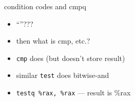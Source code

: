 \begin{frame}{condition codes and cmpq}
\begin{itemize}
\item ``''???
\item then what is cmp, etc.?
\item \texttt{cmp} does  (but doesn't store result)
\vspace{.5cm}
\item similar \texttt{test} does bitwise-and
\item {\tt {\keywordstyle testq} \%rax, \%rax} --- result is \%rax
\end{itemize}
\end{frame}



